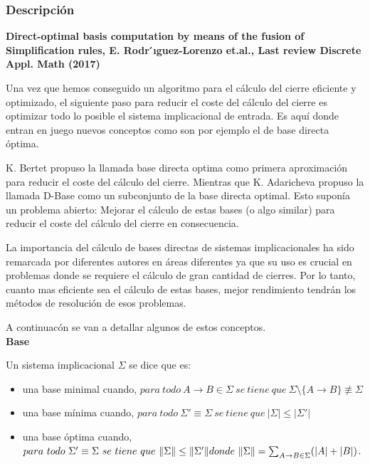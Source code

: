 \subsubsection{Descripci\'on} 

\textbf{Direct-optimal basis computation by means of the fusion of Simplification rules, E. Rodr ́ıguez-Lorenzo et.al., Last review Discrete Appl. Math (2017)}

Una vez que hemos conseguido un algoritmo para el c\'alculo del cierre eficiente y optimizado, el siguiente paso para reducir el coste del c\'alculo del cierre es optimizar todo lo posible el sistema implicacional de entrada. Es aqu\'i donde entran en juego nuevos conceptos como son por ejemplo el de base directa \'optima.

K. Bertet \cite{BERTET20102155} propuso la llamada base directa optima como primera aproximaci\'on para reducir el coste del c\'alculo del cierre. Mientras que  K. Adaricheva \cite{Adaricheva} propuso la llamada D-Base como un subconjunto de la base directa optimal. Esto supon\'ia un problema abierto: Mejorar el c\'alculo de estas bases (o algo similar) para reducir el coste del c\'alculo del cierre en consecuencia.

La importancia del c\'alculo de bases directas de sistemas implicacionales ha sido remarcada por diferentes autores en \'areas diferentes ya que su uso es crucial en problemas donde se requiere el c\'alculo de gran cantidad de cierres. Por lo tanto, cuanto mas eficiente sea el c\'alculo de estas bases, mejor rendimiento tendr\'an los m\'etodos de resoluci\'on de esos problemas. 

A continuac\'on se van a detallar algunos de estos conceptos.\\


\textbf{Base}

Un sistema implicacional \( \Sigma \) se dice que es:
\begin{itemize}
    \item una base minimal cuando,  \( para \ todo \ A \to B \in \Sigma \ se \ tiene \ que \ \Sigma \setminus \{A \to B\} \not\equiv \Sigma\)

    \item una base m\'inima cuando,  \( para \ todo \ \Sigma' \equiv \Sigma \ se \ tiene \ que \ |\Sigma| \leq |\Sigma'|\)

    \item una base \'optima cuando,  \( para \ todo \ \Sigma' \equiv \Sigma \ se \ tiene \ que \ \|\Sigma\| \leq \|\Sigma'\| \\ donde \ \|\Sigma\| = 
    \sum_{\substack{A \to B \in \Sigma}} (|A|+|B|) \).
\end{itemize}

